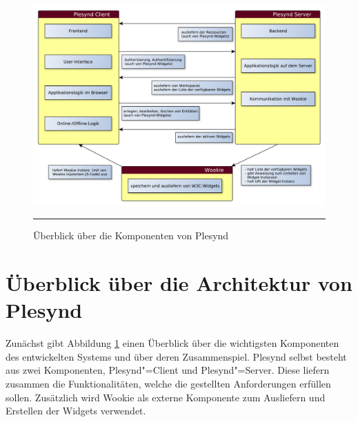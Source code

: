 \begin{figure}
  \centering
  \includegraphics[width=\textwidth,keepaspectratio]{./Figures/konzeptionelle_loesung_table.pdf}
    \rule{35em}{0.5pt}
  \caption[Überblick über die Komponenten von Plesynd]{Überblick über die Komponenten von Plesynd}
  \label{fig:ueberblick_plesynd_komponenten}
\end{figure}

\section{Überblick über die Architektur von Plesynd}\label{section:plesynd_architektur}
Zunächst gibt Abbildung \ref{fig:ueberblick_plesynd_komponenten} einen Überblick über die wichtigsten Komponenten des entwickelten Systems und über deren Zusammenspiel. Plesynd selbst besteht aus zwei Komponenten, Plesynd"=Client und Plesynd"=Server. Diese liefern zusammen die Funktionalitäten, welche die gestellten Anforderungen erfüllen sollen. Zusätzlich wird Wookie als externe Komponente zum Ausliefern und Erstellen der Widgets verwendet.

